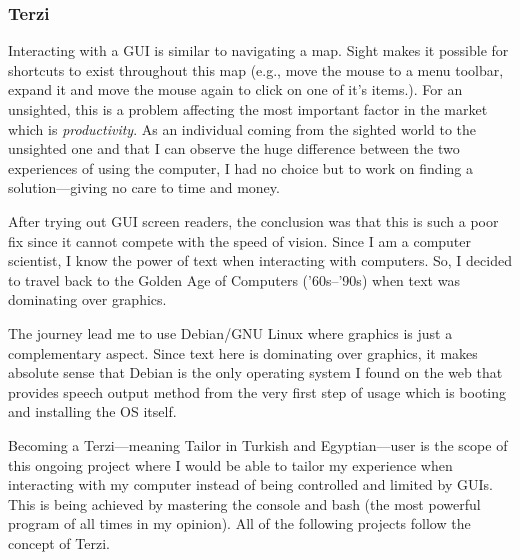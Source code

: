 \subsubsection{
Terzi
}
Interacting with a GUI is similar to navigating a map.
Sight makes it possible for shortcuts to exist throughout this map (e.g., move 
the mouse to a menu toolbar, expand it and move the mouse again to click on 
one of it's items.).
For an unsighted, this is a problem affecting the most important factor in the 
market which is \emph{productivity}.
As an individual coming from the sighted world to the unsighted one and that I 
can observe the huge difference between the two experiences of using the 
computer, I had no choice but to work on finding a solution---giving no care to 
time and money.

After trying out GUI screen readers, the conclusion was that this is such a poor 
fix since it cannot compete with the speed of vision.
Since I am a computer scientist, I know the power of text when interacting with 
computers.
So, I decided to travel back to the Golden Age of Computers ('60s--'90s) when 
text was dominating over graphics.

The journey lead me to use Debian/GNU Linux where graphics is just a 
complementary aspect.
Since text here is dominating over graphics, it makes absolute sense that Debian 
is the only operating system I found on the web that provides speech output 
method from the very first step of usage which is booting and installing the OS 
itself.

Becoming a Terzi---meaning Tailor in Turkish and Egyptian---user is the scope of 
this ongoing project where I would be able to tailor my experience when 
interacting with my computer instead of being controlled and limited by GUIs.
This is being achieved by mastering the console and bash (the most powerful 
program of all times in my opinion).
All of the following projects follow the concept of Terzi.
